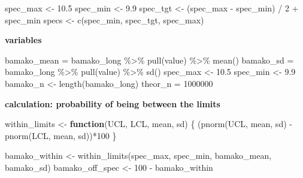 \documentclass[
]{book}
\newenvironment{Shaded}{\begin{snugshade}}{\end{snugshade}}
\newcommand{\ControlFlowTok}[1]{\textcolor[rgb]{0.13,0.29,0.53}{\textbf{#1}}}
\newcommand{\DecValTok}[1]{\textcolor[rgb]{0.00,0.00,0.81}{#1}}
\newcommand{\FloatTok}[1]{\textcolor[rgb]{0.00,0.00,0.81}{#1}}
\newcommand{\FunctionTok}[1]{\textcolor[rgb]{0.00,0.00,0.00}{#1}}
\newcommand{\NormalTok}[1]{#1}
\newcommand{\OtherTok}[1]{\textcolor[rgb]{0.56,0.35,0.01}{#1}}
\newcommand{\SpecialCharTok}[1]{\textcolor[rgb]{0.00,0.00,0.00}{#1}}
\begin{document}
\begin{Shaded}
\begin{Highlighting}[]
\NormalTok{spec\_max }\OtherTok{\textless{}{-}} \FloatTok{10.5}
\NormalTok{spec\_min }\OtherTok{\textless{}{-}} \FloatTok{9.9}
\NormalTok{spec\_tgt }\OtherTok{\textless{}{-}}\NormalTok{ (spec\_max }\SpecialCharTok{{-}}\NormalTok{ spec\_min) }\SpecialCharTok{/} \DecValTok{2} \SpecialCharTok{+}\NormalTok{ spec\_min}
\NormalTok{specs }\OtherTok{\textless{}{-}} \FunctionTok{c}\NormalTok{(spec\_min, spec\_tgt, spec\_max)}
\end{Highlighting}
\end{Shaded}

\textbf{variables}

\begin{Shaded}
\begin{Highlighting}[]
\NormalTok{bamako\_mean }\OtherTok{=}\NormalTok{ bamako\_long }\SpecialCharTok{\%\textgreater{}\%} \FunctionTok{pull}\NormalTok{(value) }\SpecialCharTok{\%\textgreater{}\%} \FunctionTok{mean}\NormalTok{()}
\NormalTok{bamako\_sd }\OtherTok{=}\NormalTok{ bamako\_long }\SpecialCharTok{\%\textgreater{}\%} \FunctionTok{pull}\NormalTok{(value) }\SpecialCharTok{\%\textgreater{}\%} \FunctionTok{sd}\NormalTok{()}
\NormalTok{spec\_max }\OtherTok{\textless{}{-}} \FloatTok{10.5}
\NormalTok{spec\_min }\OtherTok{\textless{}{-}} \FloatTok{9.9}
\NormalTok{bamako\_n }\OtherTok{\textless{}{-}} \FunctionTok{length}\NormalTok{(bamako\_long)}
\NormalTok{theor\_n }\OtherTok{=} \DecValTok{1000000}
\end{Highlighting}
\end{Shaded}

\textbf{calculation: probability of being between the limits}

\begin{Shaded}
\begin{Highlighting}[]
\NormalTok{within\_limits }\OtherTok{\textless{}{-}} \ControlFlowTok{function}\NormalTok{(UCL, LCL, mean, sd) \{}
\NormalTok{  (}\FunctionTok{pnorm}\NormalTok{(UCL, mean, sd) }\SpecialCharTok{{-}} \FunctionTok{pnorm}\NormalTok{(LCL, mean, sd))}\SpecialCharTok{*}\DecValTok{100}
\NormalTok{\}}
\end{Highlighting}
\end{Shaded}

\begin{Shaded}
\begin{Highlighting}[]
\NormalTok{bamako\_within }\OtherTok{\textless{}{-}} \FunctionTok{within\_limits}\NormalTok{(spec\_max, spec\_min, bamako\_mean, bamako\_sd)}
\NormalTok{bamako\_off\_spec }\OtherTok{\textless{}{-}} \DecValTok{100} \SpecialCharTok{{-}}\NormalTok{ bamako\_within}
\end{Highlighting}
\end{Shaded}
\end{document}
